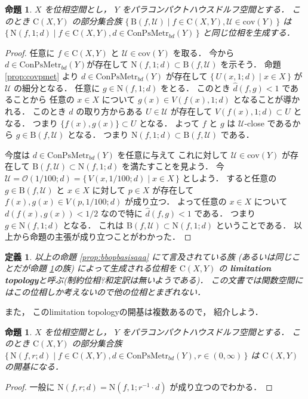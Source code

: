 \documentclass[leqno, a4paper, 12pt]{jsarticle}
\numberwithin{equation}{section}
\newtheorem{prop}[thm]{命題}
\newtheorem{df}[thm]{定義}
\newcommand{\yocov}[1]{\mathrm{cov}(#1)}
\newcommand{\yocovfont}[1]{\mathscr{#1}}
\newcommand{\yomapl}[2]{\mathrm{C}(#1, #2)}
\newcommand{\yonbset}[2]{\mathrm{B}(#1, #2)}
\newcommand{\yonbsetq}[3]{\mathrm{N}(#1, #2; #3)}
\newcommand{\yosupmet}[1]{\hat{#1}}
\newcommand{\yocbmet}[1]{\mathrm{ConPsMetr}_{bd}(#1)}
\newcommand{\yoball}[3]{V(#1, #2; #3)}
\newcommand{\yoballfam}[2]{\yocovfont{O}(#1; #2)}
\begin{document}
\begin{prop}\label{prop:bbopbasis}
$X$
を位相空間とし，
$Y$
をパラコンパクトハウスドルフ空間とする．
このとき
$\yomapl{X}{Y}$
の部分集合族
$\{\, \yonbset{f}{\yocovfont{U}}\mid f\in \yomapl{X}{Y}, \yocovfont{U}\in \yocov{Y}\, \}$
は
$\{\, \yonbsetq{f}{1}{d}\mid f\in \yomapl{X}{Y}, 
d\in \yocbmet{Y}\, \}$
と同じ位相を生成する．
\end{prop}
\begin{proof}
任意に
$f\in \yomapl{X}{Y}$
と
$\yocovfont{U}\in \yocov{Y}$
を取る．
今から
$d\in \yocbmet{Y}$が存在して
$\yonbsetq{f}{1}{d}\subset \yonbset{f}{\yocovfont{U}}$
を示そう．
命題
\ref{prop:covpmet}
より
$d\in \yocbmet{Y}$
が存在して
$\{\, U(x, 1; d)\mid x\in X\, \}$
が
$\yocovfont{U}$
の細分となる．
任意に
$g\in \yonbsetq{f}{1}{d}$
をとる．
このとき
$\yosupmet{d}(f, g)<1$
であることから
任意の
$x\in X$
について
$g(x)\in \yoball{f(x)}{1}{d}$
となることが導かれる．
このとき
$d$
の取り方からある
$U\in \yocovfont{U}$
が存在して
$\yoball{f(x)}{1}{d}\subset U$
となる．
つまり
$\{f(x), g(x)\}\subset U$
となる．
よって
$f$
と
$g$
は
$\yocovfont{U}$-close
であるから
$g\in \yonbset{f}{\yocovfont{U}}$
となる．
つまり
$\yonbsetq{f}{1}{d}\subset \yonbset{f}{\yocovfont{U}}$
である．


今度は
$d\in \yocbmet{Y}$
を任意に与えて
これに対して
$\yocovfont{U}\in \yocov{Y}$
が存在して
$\yonbset{f}{\yocovfont{U}}\subset \yonbsetq{f}{1}{d}$
を満たすことを見よう．
今
$\yocovfont{U}=\yoballfam{1/100}{d}=
\{\, \yoball{x}{1/100}{d}\mid x\in X\, \}$
としよう．
すると任意の
$g\in \yonbset{f}{\yocovfont{U}}$
と
$x\in X$
に対して
$p\in  X$
が存在して
$f(x), g(x)\in \yoball{p}{1/100}{d}$
が成り立つ．
よって任意の
$x\in X$
について
$d(f(x), g(x))<1/2$
なので特に
$\yosupmet{d}(f, g)<1$
である．
つまり
$g\in \yonbsetq{f}{1}{d}$
となる．
これは
$\yonbset{f}{\yocovfont{U}}\subset \yonbsetq{f}{1}{d}$
ということである．
以上から命題の主張が成り立つことがわかった．
\end{proof}


\begin{df}
以上の命題
\ref{prop:bbopbasisaaa}
にて言及されている族
(あるいは同じことだが命題
\ref{prop:bbopbasis}の族)
によって生成される位相を
$\yomapl{X}{Y}$
の
\textbf{limitation topology}と呼ぶ(制約位相?和定訳は無いようである)．
この文書では関数空間にはこの位相しか考えないので他の位相とまぎれない．
\end{df}


また，
このlimitation topologyの開基は複数あるので，
紹介しよう．

\begin{prop}\label{prop:basis2}
$X$
を位相空間とし，
$Y$
をパラコンパクトハウスドルフ空間とする．
このとき
$\yomapl{X}{Y}$
の部分集合族
$\{\, \yonbsetq{f}{r}{d}\mid f\in \yomapl{X}{Y}, 
d\in \yocbmet{Y}, r\in (0, \infty)\, \}$
は
$\yomapl{X}{Y}$
の開基になる．
\end{prop}
\begin{proof}
一般に
$ \yonbsetq{f}{r}{d}= \yonbsetq{f}{1}{r^{-1}\cdot d}$
が成り立つのでわかる．
\end{proof}
\end{document}
